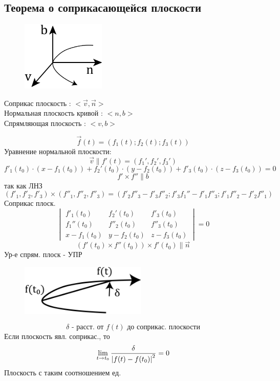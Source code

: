 \documentclass[main]{subfiles}
\begin{document}
\subsection{Теорема о соприкасающейся плоскости}

	\begin{definition}
		\begin{figure}[H]
		    \includegraphics[width=4cm]{pics/4_1.png}
		    \centering
		\end{figure}

	    Соприкас плоскость : $<\vec{v}, \vec{n}>$\\
		Нормальная плоскость кривой : $<n, b>$\\
		Спрямляющая плоскость : $<v, b>$
	\end{definition}

	\begin{Theorem}
		\[\vec{f}(t) = (f_1(t); f_2(t); f_3(t))\]
		Уравнение нормальной плоскости:
		\[\vec{v} \parallel f'(t) = (f_1', f_2', f_3')\]
        \[f'_1(t_0) \cdot(x - f_1(t_0)) +
		f_2'(t_0) \cdot (y - f_2(t_0)) + f'_3(t_0) \cdot (z - f_3(t_0)) = 0\]
		\[f' \times f'' \parallel b\]
		так как ЛНЗ
		\[(f'_1, f'_2, f'_3) \times (f''_1, f''_2, f''_3) = (f'_2 f''_3 - f'_3 f''_2;
		f'_3 f_1'' - f'_1 f''_3; f'_1 f''_2 - f'_2 f''_1)\]
		Соприкас плоск.
		\[\begin{vmatrix}
			f'_1(t_0) & f_2'(t_0) & f'_3(t_0)\\
			f_1''(t_0) & f''_2(t_0) & f''_3(t_0)\\
			x - f_1(t_0) & y - f_2(t_0) & z - f_3(t_0)
		\end{vmatrix} = 0\]
		\[(f'(t_0) \times f''(t_0)) \times f'(t_0) \parallel \vec{n}\]
		Ур-е спрям. плоск - УПР
	\end{Theorem}

	\begin{Theorem}
		\begin{figure}[H]
		    \includegraphics[width=6cm]{pics/4_2.png}
		    \centering
		\end{figure}

		\[\delta \text{ - расст. от } f(t) \text{ до соприкас. плоскости}\]
		Если плоскость явл. соприкас., то
		\[\lim_{t \to t_0} \frac{\delta}{\left|f(t) - f(t_0)\right|^2} = 0 \]
		Плоскость с таким соотношением ед.
	\end{Theorem}
\end{document}

